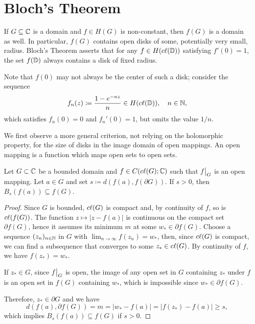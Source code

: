 \section{Bloch's Theorem}
\label{sec:blochs-theorem}

If $G \subseteq \mathbb{C}$ is a domain and $f \in H(G)$ is non-constant, then $f(G)$ is a domain as well. In particular, $f(G)$ contains open disks of some, potentially very small, radius. Bloch's Theorem asserts that for any $f \in H(c\ell({\mathbb{D}}))$ satisfying $f'(0) = 1$, the set $f(\mathbb{D})$ always contains a disk of fixed radius.

Note that $f(0)$ may not always be the center of such a disk; consider the sequence
\begin{equation*}
    f_n(z) \coloneqq \frac{1 - e^{- n z}}{n} \in H(c\ell({\mathbb{D}})), \quad n \in \mathbb{N},
\end{equation*}
which satisfies $f_n(0) = 0$ and $f_n'(0) = 1$, but omits the value $1 / n$.

We first observe a more general criterion, not relying on the holomorphic property, for the size of disks in the image domain of open mappings. An open mapping is a function which maps open sets to open sets.

\begin{lemma} \label{lem:bloch-lemma-1}
    Let $G \subset \mathbb{C}$ be a bounded domain and $f \in C(c\ell({G}); \mathbb{C})$ such that $\restr{f}{G}$ is an open mapping. Let $a \in G$ and set $s \coloneqq d(f(a), f(\partial G))$. If $s > 0$, then $B_{s}(f(a)) \subseteq f(G)$.
\end{lemma}

\begin{proof}
    Since $G$ is bounded, $c\ell({G})$ is compact and, by continuity of $f$, so is $c\ell({f(G)})$.
    The function $z \mapsto \vert z - f(a) \vert$ is continuous on the compact set $\partial f(G)$, hence it assumes its minimum $m$ at some $w_* \in \partial f(G)$. Choose a sequence $(z_n)_{n \in \mathbb{N}}$ in $G$ with $\lim_{n \to \infty} f(z_n) = w_*$, then, since $c\ell({G})$ is compact, we can find a subsequence that converges to some $z_* \in c\ell({G})$. By continuity of $f$, we have $f(z_*) = w_*$.

    If $z_* \in G$, since $\restr{f}{G}$ is open, the image of any open set in $G$ containing $z_*$ under $f$ is an open set in $f(G)$ containing $w_*$, which is impossible since $w_* \in \partial f(G)$.

    Therefore, $z_* \in \partial G$ and we have
    $$ d(f(a), \partial f(G)) = m = \vert w_* - f(a) \vert = \vert f(z_*) - f(a) \vert \geq s, $$
    which implies $B_{s}(f(a)) \subseteq f(G)$ if $s > 0$.
\end{proof}


